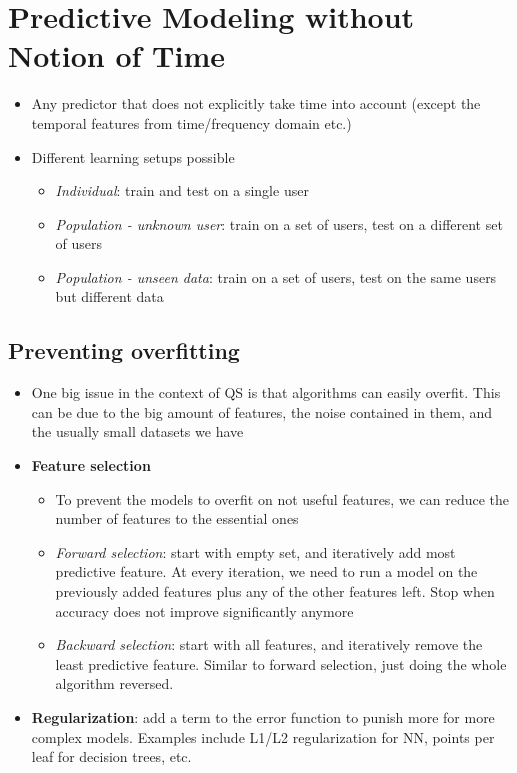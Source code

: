 \section{Predictive Modeling without Notion of Time}
\begin{itemize}
	\item Any predictor that does not explicitly take time into account (except the temporal features from time/frequency domain etc.)
	\item Different learning setups possible
	\begin{itemize}
		\item \textit{Individual}: train and test on a single user
		\item \textit{Population - unknown user}: train on a set of users, test on a different set of users
		\item \textit{Population - unseen data}: train on a set of users, test on the same users but different data
	\end{itemize}
\end{itemize}
\subsection{Preventing overfitting}
\begin{itemize}
	\item One big issue in the context of QS is that algorithms can easily overfit. This can be due to the big amount of features, the noise contained in them, and the usually small datasets we have
	\item \textbf{Feature selection}
	\begin{itemize}
		\item To prevent the models to overfit on not useful features, we can reduce the number of features to the essential ones
		\item \textit{Forward selection}: start with empty set, and iteratively add most predictive feature. At every iteration, we need to run a model on the previously added features plus any of the other features left. Stop when accuracy does not improve significantly anymore
		\item \textit{Backward selection}: start with all features, and iteratively remove the least predictive feature. Similar to forward selection, just doing the whole algorithm reversed.
	\end{itemize}
	\item \textbf{Regularization}: add a term to the error function to punish more for more complex models. Examples include L1/L2 regularization for NN, points per leaf for decision trees, etc.
\end{itemize}